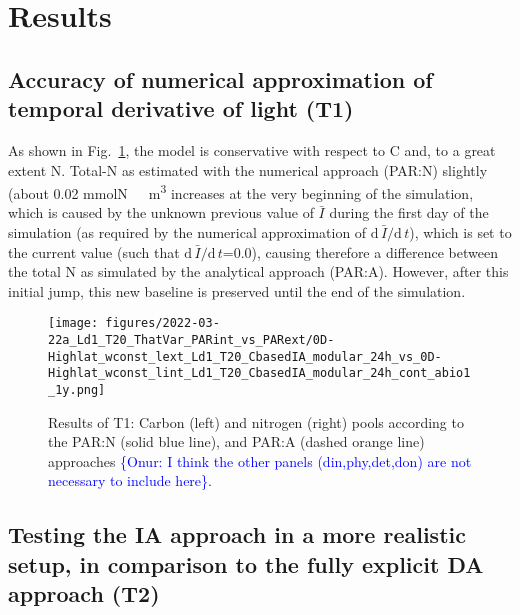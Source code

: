 \documentclass[gmd, manuscript]{copernicus}
\newcommand{\onur}[1]{\textcolor{blue}{\{Onur: #1\}}}
\begin{document}



\section{Results}

\subsection{Accuracy of numerical approximation of temporal derivative of light (T1)}
As shown in Fig.~\ref{f.T1res}, the model is conservative with respect to C and, to a great extent N\@. Total-N as estimated with the numerical approach (PAR:N) slightly (about 0.02 \unit{mmolN\ m^3} increases at the very beginning of the simulation, which is caused by the unknown previous value of $\bar{I}$ during the first day of the simulation (as required by the numerical approximation of $\text{d}\,\bar{I}/\text{d}\,t$), which is set to the current value (such that $\text{d}\,\bar{I}/\text{d}\,t$=0.0), causing therefore a difference between the total N as simulated by the analytical approach (PAR:A). However, after this initial jump, this new baseline is preserved until the end of the simulation.

\begin{figure}[ht!]
\texttt{[image: figures/2022-03-22a\_Ld1\_T20\_ThatVar\_PARint\_vs\_PARext/0D-Highlat\_wconst\_lext\_Ld1\_T20\_CbasedIA\_modular\_24h\_vs\_0D-Highlat\_wconst\_lint\_Ld1\_T20\_CbasedIA\_modular\_24h\_cont\_abio1\_1y.png]}
\caption{Results of T1: Carbon (left) and nitrogen (right) pools according to the PAR:N (solid blue line), and PAR:A (dashed orange line) approaches \onur{I think the other panels (din,phy,det,don) are not necessary to include here}.\label{f.T1res}}
\end{figure}

\FloatBarrier

\subsection{Testing the IA approach in a more realistic setup, in comparison to the fully explicit DA approach (T2)}
\end{document}
